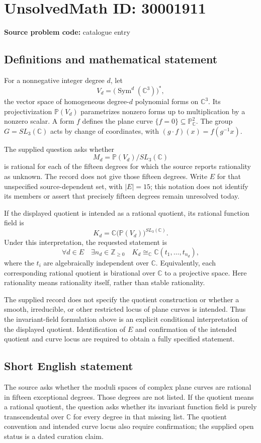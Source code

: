 \documentclass[11pt]{article}
\newcommand{\Z}{\mathbb{Z}}
\newcommand{\C}{\mathbb{C}}
\newcommand{\PP}{\mathbb{P}}
\begin{document}
\section*{UnsolvedMath ID: 30001911}
\textbf{Source problem code:} catalogue entry
\subsection{Definitions and mathematical statement}
For a nonnegative integer degree \(d\), let
\[
V_d=\bigl(\operatorname{Sym}^d(\C^3)\bigr)^*,
\]
the vector space of homogeneous degree-\(d\) polynomial forms on \(\C^3\). Its projectivization \(\PP(V_d)\) parametrizes nonzero forms up to multiplication by a nonzero scalar. A form \(f\) defines the plane curve \(\{f=0\}\subseteq\PP^2_{\C}\). The group \(G=SL_3(\C)\) acts by change of coordinates, with \((g\cdot f)(x)=f(g^{-1}x)\).

The supplied question asks whether
\[
M_d=\PP(V_d)/SL_3(\C)
\]
is rational for each of the fifteen degrees for which the source reports rationality as unknown. The record does not give those fifteen degrees. Write \(E\) for that unspecified source-dependent set, with \(|E|=15\); this notation does not identify its members or assert that precisely fifteen degrees remain unresolved today.

If the displayed quotient is intended as a rational quotient, its rational function field is
\[
K_d=\C\bigl(\PP(V_d)\bigr)^{SL_3(\C)}.
\]
Under this interpretation, the requested statement is
\[
\forall d\in E\quad \exists n_d\in\Z_{\geq0}\quad
K_d\cong_{\C}\C(t_1,\ldots,t_{n_d}),
\]
where the \(t_i\) are algebraically independent over \(\C\). Equivalently, each corresponding rational quotient is birational over \(\C\) to a projective space. Here rationality means rationality itself, rather than stable rationality.

The supplied record does not specify the quotient construction or whether a smooth, irreducible, or other restricted locus of plane curves is intended. Thus the invariant-field formulation above is an explicit conditional interpretation of the displayed quotient. Identification of \(E\) and confirmation of the intended quotient and curve locus are required to obtain a fully specified statement.
\subsection{Short English statement}
The source asks whether the moduli spaces of complex plane curves are rational in fifteen exceptional degrees. Those degrees are not listed. If the quotient means a rational quotient, the question asks whether its invariant function field is purely transcendental over \(\C\) for every degree in that missing list. The quotient convention and intended curve locus also require confirmation; the supplied open status is a dated curation claim.
\end{document}
